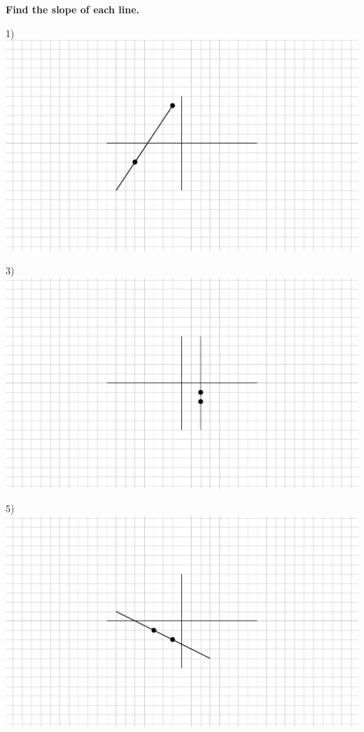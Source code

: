 \documentclass[11pt]{book}
\newcommand{\tmstrong}[1]{\textbf{#1}}
\theoremstyle{definition}  %
\begin{document}
{\tmstrong{Find the slope of each line.}}
\label{lineargraphs1}
\begin{multicols}{2}
  1)\\
	\includegraphics[scale=.8,bb = 115 65 310 190, clip=true]{II_1_3cp-1.eps}
  
  3)\\
	\includegraphics[scale=.8,bb = 115 65 310 190, clip=true]{II_1_3cp-2.eps}
  
  
  
  
  
  5)\\
	\includegraphics[scale=.8,bb = 115 65 310 190, clip=true]{II_1_3cp-6.eps}
  

\end{multicols}
\end{document}
